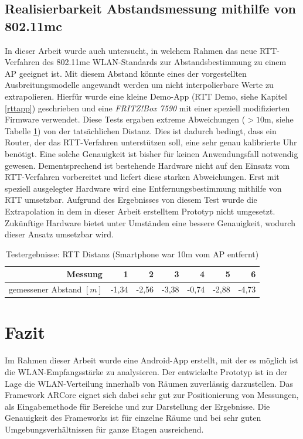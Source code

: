 \documentclass[10pt]{scrartcl}
\begin{document}
\subsection{Realisierbarkeit Abstandsmessung mithilfe von 802.11mc}
\label{RTTTest}
In dieser Arbeit wurde auch untersucht, in welchem Rahmen das neue RTT-Verfahren des 802.11mc WLAN-Standards zur Abstandsbestimmung zu einem AP geeignet ist. Mit diesem Abstand könnte eines der vorgestellten Ausbreitungsmodelle angewandt werden um nicht interpolierbare Werte zu extrapolieren. Hierfür wurde eine kleine Demo-App (RTT Demo, siehe Kapitel \ref{rttapp}) geschrieben und eine \textit{FRITZ!Box 7590} mit einer speziell modifizierten Firmware verwendet. Diese Tests ergaben extreme Abweichungen ($> 10$m, siehe Tabelle \ref{tab:rtt}) von der tatsächlichen Distanz. Dies ist dadurch bedingt, dass ein Router, der das RTT-Verfahren unterstützen soll, eine sehr genau kalibrierte Uhr benötigt. Eine solche Genauigkeit ist bisher für keinen Anwendungsfall notwendig gewesen. Dementsprechend ist bestehende Hardware nicht auf den Einsatz vom RTT-Verfahren vorbereitet und liefert diese starken Abweichungen. Erst mit speziell ausgelegter Hardware wird eine Entfernungsbestimmung mithilfe von RTT umsetzbar. Aufgrund des Ergebnisses von diesem Test wurde die Extrapolation in dem in dieser Arbeit erstelltem Prototyp nicht umgesetzt. Zukünftige Hardware bietet unter Umständen eine bessere Genauigkeit, wodurch dieser Ansatz umsetzbar wird.

\begin{table}
\centering
\begin{tabular}{|r|r|r|r|r|r|r|}
\hline
Messung & 1 & 2 & 3 & 4 & 5 & 6 \\\hline
gemessener Abstand $[m]$ & -1,34 & -2,56 & -3,38 & -0,74 & -2,88 & -4,73\\
\hline
\end{tabular}
\caption{\label{tab:rtt}Testergebnisse: RTT Distanz (Smartphone war 10m vom AP entfernt)}
\end{table}

\section{Fazit}
Im Rahmen dieser Arbeit wurde eine Android-App erstellt, mit der es möglich ist die WLAN-Empfangsstärke zu analysieren. Der entwickelte Prototyp ist in der Lage die WLAN-Verteilung innerhalb von Räumen zuverlässig darzustellen. Das Framework ARCore eignet sich dabei sehr gut zur Positionierung von Messungen, als Eingabemethode für Bereiche und zur Darstellung der Ergebnisse. Die Genauigkeit des Frameworks ist für einzelne Räume und bei sehr guten Umgebungsverhältnissen für ganze Etagen ausreichend. 
\end{document}
